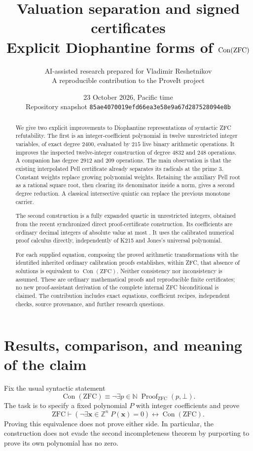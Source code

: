 \documentclass[11pt,a4paper]{article}
\title{\textbf{Valuation separation and signed certificates}\\[3pt]
Explicit Diophantine forms of $\Con(\ZFC)$}
\author{AI-assisted research prepared for Vladimir Reshetnikov\\
\small A reproducible contribution to the ProveIt project}
\date{23 October 2026, Pacific time\\[-1pt]
\small Repository snapshot \texttt{85ae4070019efd66ea3e58e9a67d287528094e8b}}
\theoremstyle{remark}\newtheorem{remark}[theorem]{Remark}
\newcommand{\Z}{\mathbb Z}\newcommand{\Q}{\mathbb Q}\newcommand{\N}{\mathbb N}
\newcommand{\Con}{\operatorname{Con}}\newcommand{\ZFC}{\mathrm{ZFC}}
\begin{document}
\maketitle
\begin{abstract}
We give two explicit improvements to Diophantine representations of syntactic
ZFC refutability. The first is an integer-coefficient polynomial in twelve
unrestricted integer variables, of exact degree $2400$, evaluated by $215$
live binary arithmetic operations. It improves the inspected twelve-integer
construction of degree $4832$ and $248$ operations. A companion has degree
$2912$ and $209$ operations. The main observation is that the existing
interpolated Pell certificate already separates its radicals at the prime
$3$. Constant weights replace growing polynomial weights. Retaining the
auxiliary Pell root as a rational square root, then clearing its denominator
inside a norm, gives a second degree reduction. A classical intersective
quintic can replace the previous monotone carrier.

The second construction is a fully expanded quartic in \DirectVariables{}
unrestricted integers, obtained from the recent synchronized direct
proof-certificate construction. Its coefficients are ordinary decimal
integers of absolute value at most \DirectHeight{}. It uses the calibrated
numerical proof calculus directly, independently of K215 and Jones's
universal polynomial.

For each supplied equation, composing the proved arithmetic transformations
with the identified inherited ordinary calibration proofs establishes,
within ZFC, that absence of solutions is equivalent to $\Con(\ZFC)$.
Neither consistency nor inconsistency is assumed. These are ordinary
mathematical proofs and reproducible finite certificates; no new
proof-assistant derivation of the complete internal ZFC biconditional is
claimed. The contribution includes exact equations, coefficient recipes,
independent checks, source provenance, and further research questions.
\end{abstract}
\clearpage
\tableofcontents
\newpage
\section{Results, comparison, and meaning of the claim}\label{sec:results}

Fix the usual syntactic statement
\[
 \Con(\ZFC)\equiv
 \neg\exists p\in\N\;\operatorname{Proof}_{\ZFC}(p,\bot).
\]
The task is to specify a fixed polynomial $P$ with integer coefficients and
prove
\begin{equation}\label{eq:target}
 \ZFC\vdash
 \left(\neg\exists\mathbf x\in\Z^n\;P(\mathbf x)=0\right)
 \longleftrightarrow \Con(\ZFC).
\end{equation}
Proving this equivalence does not prove either side. In particular, the
construction does not evade the second incompleteness theorem by purporting
to prove its own polynomial has no zero.
\end{document}
